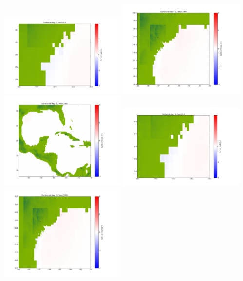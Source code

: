 \documentclass[11pt]{article}
\begin{document}
\vskip 10pt 
\includegraphics[width=0.475\textwidth]{frame0045fig1001.png}
\includegraphics[width=0.475\textwidth]{frame0045fig1002.png}
\vskip 10pt 
\includegraphics[width=0.475\textwidth]{frame0045fig1003.png}
\vskip 10pt 
\includegraphics[width=0.475\textwidth]{frame0046fig1001.png}
\includegraphics[width=0.475\textwidth]{frame0046fig1002.png}
\end{document}
